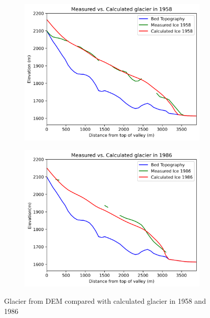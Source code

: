 \documentclass{article}
\begin{document}
\begin{figure}[h!]
    \centering
    \begin{subfigure}[b]{0.49\textwidth}
        \centering
        \includegraphics[width=\textwidth]{Plots/1958_glacier_comparison.png}
        \label{fig:1958_glacier_comparison}
    \end{subfigure}
    \hfill
    \begin{subfigure}[b]{0.49\textwidth}
        \centering
        \includegraphics[width=\textwidth]{Plots/1986_glacier_comparison.png}
        \label{fig:v}
    \end{subfigure}
    \caption{Glacier from DEM compared with calculated glacier in 1958 and 1986}
    \label{fig:1986_glacier_comparison}
\end{figure}
\FloatBarrier
\end{document}
